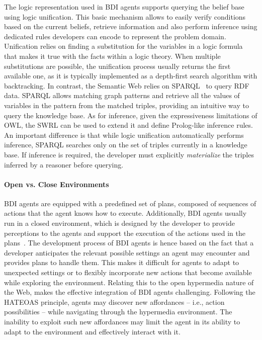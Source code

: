 \documentclass[
]{ceurart}
\begin{document}
The logic representation used in \ac{BDI} agents supports querying the belief base using logic unification.
%
This basic mechanism allows to easily verify conditions based on the current beliefs, retrieve information and also perform inference using dedicated rules developers can encode to represent the problem domain.
%
Unification relies on finding a substitution for the variables in a logic formula that makes it true with the facts within a logic theory. When multiple substitutions are possible, the unification process usually returns the first available one, as it is typically implemented as a depth-first search algorithm with backtracking.
%
In contrast, the Semantic Web relies on \acs{SPARQL}~\cite{sparqlprotocol} to query \ac{RDF} data.
\acs{SPARQL} allows matching graph patterns and retrieve all the values of variables in the pattern from the matched triples, 
providing an intuitive way to query the knowledge base.
%
As for inference, given the expressiveness limitations of \ac{OWL}, the \ac{SWRL} can be used to extend it and define Prolog-like inference rules.
%
An important difference is that while logic unification automatically performs inference, \acs{SPARQL} searches only on the set of triples currently in a knowledge base. If inference is required, the developer must explicitly \emph{materialize} the triples inferred by a reasoner before querying.


\paragraph{Open vs. Close Environments}
\ac{BDI} agents are equipped with a predefined set of plans, composed of sequences of actions that the agent knows how to execute.
%
Additionally, \ac{BDI} agents usually run in a closed environment,
which is designed by the developer to provide perceptions to the agents and 
support the execution of the actions used in the plans~\cite{weyns2007aamas}. 
%
The development process of \ac{BDI} agents is hence based on the fact that a developer anticipates 
the relevant possible settings an agent may encounter and provides plans to handle them.
%
This makes it difficult for agents to adapt to unexpected settings or to flexibly incorporate new actions that become available while exploring the environment.
%
Relating this to the open hypermedia nature of the Web, makes the effective integration of \ac{BDI} agents challenging.
%
Following the \ac{HATEOAS} principle, agents may discover new affordances
-- i.e., action possibilities --
while navigating through the hypermedia environment.
%
The inability to exploit such new affordances may limit the agent in its ability to adapt to the environment and effectively interact with it.
\end{document}
